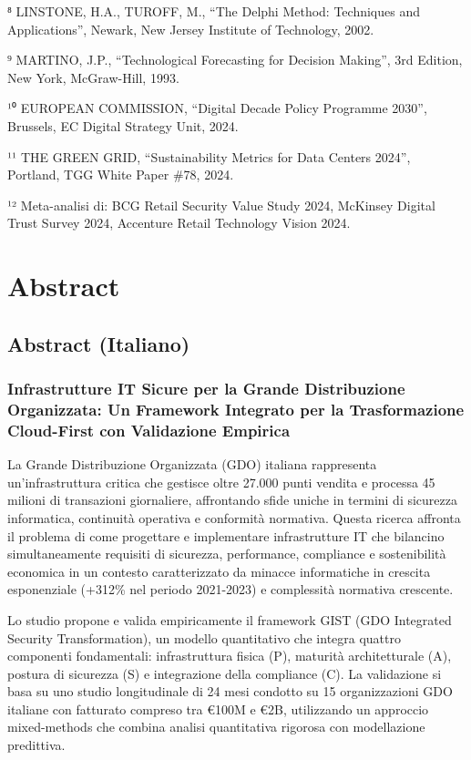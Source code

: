 \documentclass[12pt,a4paper,oneside]{book}
\numberwithin{figure}{chapter} %
\numberwithin{table}{chapter}  %
\begin{document}
⁸ LINSTONE, H.A., TUROFF, M., ``The Delphi Method: Techniques and
Applications'', Newark, New Jersey Institute of Technology, 2002.

⁹ MARTINO, J.P., ``Technological Forecasting for Decision Making'', 3rd
Edition, New York, McGraw-Hill, 1993.

¹⁰ EUROPEAN COMMISSION, ``Digital Decade Policy Programme 2030'',
Brussels, EC Digital Strategy Unit, 2024.

¹¹ THE GREEN GRID, ``Sustainability Metrics for Data Centers 2024'',
Portland, TGG White Paper \#78, 2024.

¹² Meta-analisi di: BCG Retail Security Value Study 2024, McKinsey
Digital Trust Survey 2024, Accenture Retail Technology Vision 2024.

\chapter{Abstract}\label{abstract-1}

\section{Abstract (Italiano)}\label{abstract-italiano}

\subsection{Infrastrutture IT Sicure per la Grande Distribuzione
Organizzata: Un Framework Integrato per la Trasformazione Cloud-First
con Validazione
Empirica}\label{infrastrutture-it-sicure-per-la-grande-distribuzione-organizzata-un-framework-integrato-per-la-trasformazione-cloud-first-con-validazione-empirica}

La Grande Distribuzione Organizzata (GDO) italiana rappresenta
un'infrastruttura critica che gestisce oltre 27.000 punti vendita e
processa 45 milioni di transazioni giornaliere, affrontando sfide uniche
in termini di sicurezza informatica, continuità operativa e conformità
normativa. Questa ricerca affronta il problema di come progettare e
implementare infrastrutture IT che bilancino simultaneamente requisiti
di sicurezza, performance, compliance e sostenibilità economica in un
contesto caratterizzato da minacce informatiche in crescita esponenziale
(+312\% nel periodo 2021-2023) e complessità normativa crescente.

Lo studio propone e valida empiricamente il framework GIST (GDO
Integrated Security Transformation), un modello quantitativo che integra
quattro componenti fondamentali: infrastruttura fisica (P), maturità
architetturale (A), postura di sicurezza (S) e integrazione della
compliance (C). La validazione si basa su uno studio longitudinale di 24
mesi condotto su 15 organizzazioni GDO italiane con fatturato compreso
tra €100M e €2B, utilizzando un approccio mixed-methods che combina
analisi quantitativa rigorosa con modellazione predittiva.
\end{document}
